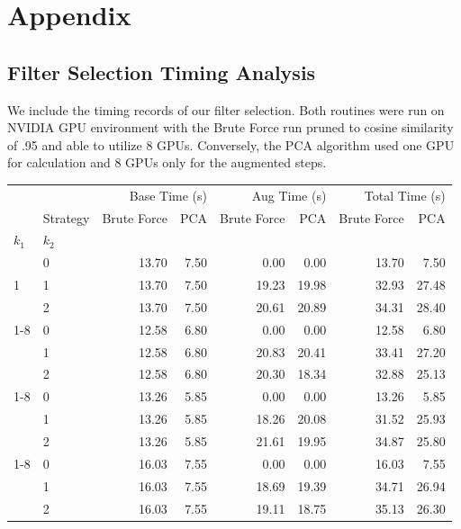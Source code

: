 
\section{Appendix}

\subsection{Filter Selection Timing Analysis}

We include the timing records of our filter selection. 
Both routines were run on NVIDIA GPU environment with the Brute Force run pruned to cosine similarity of .95 and able to utilize 8 GPUs. 
Conversely, the PCA algorithm used one GPU for calculation and 8 GPUs only for the augmented steps. 

\begin{table}[htbp]
    \begin{tabular}{llrrrrrr}
    \toprule
    &  & \multicolumn{2}{r}{Base Time (s)} & \multicolumn{2}{r}{Aug Time (s)} & \multicolumn{2}{r}{Total Time (s)} \\
    & Strategy & Brute Force & PCA & Brute Force & PCA & Brute Force & PCA \\
    $k_1$ & $k_2$ &  &  &  &  &  &  \\
    \midrule
    \multirow[t]{3}{*}{1} & 0 & 13.70 & 7.50 & 0.00 & 0.00 & 13.70 & 7.50 \\
    & 1 & 13.70 & 7.50 & 19.23 & 19.98 & 32.93 & 27.48 \\
    & 2 & 13.70 & 7.50 & 20.61 & 20.89 & 34.31 & 28.40 \\
    \cline{1-8}
    \multirow[t]{3}{*}{2} & 0 & 12.58 & 6.80 & 0.00 & 0.00 & 12.58 & 6.80 \\
    & 1 & 12.58 & 6.80 & 20.83 & 20.41 & 33.41 & 27.20 \\
    & 2 & 12.58 & 6.80 & 20.30 & 18.34 & 32.88 & 25.13 \\
    \cline{1-8}
    \multirow[t]{3}{*}{3} & 0 & 13.26 & 5.85 & 0.00 & 0.00 & 13.26 & 5.85 \\
    & 1 & 13.26 & 5.85 & 18.26 & 20.08 & 31.52 & 25.93 \\
    & 2 & 13.26 & 5.85 & 21.61 & 19.95 & 34.87 & 25.80 \\
    \cline{1-8}
    \multirow[t]{3}{*}{4} & 0 & 16.03 & 7.55 & 0.00 & 0.00 & 16.03 & 7.55 \\
    & 1 & 16.03 & 7.55 & 18.69 & 19.39 & 34.71 & 26.94 \\
    & 2 & 16.03 & 7.55 & 19.11 & 18.75 & 35.13 & 26.30 \\

\end{tabular}
\end{table}
